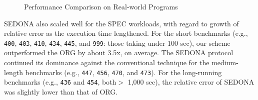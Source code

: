 \documentclass[letter]{ieice}
\begin{document}
\begin{figure}[t]
{		\label{fig:matc_std}
	}
	\vspace{-.1in}
	\caption{{\color{blue}Performance Comparison on Real-world Programs~\label{fig:synprog_test}}}
\vspace{-.2in}
\end{figure}

SEDONA also scaled well for the SPEC workloads, 
with regard to growth of relative error as the execution time lengthened.
For the short benchmarks 
(e.g., {\tt 400}, {\tt 403}, {\tt 410}, 
{\tt 434}, {\tt 445}, and {\tt 999}: those taking \hbox{under} 100 sec), 
our scheme outperformed the ORG by about 3.5x, on average. 
The SEDONA protocol continued its dominance against the conventional technique 
for the medium-length benchmarks (e.g., {\tt 447}, {\tt 456}, {\tt 470}, and {\tt 473}).
For the long-running benchmarks (e.g., {\tt 436} and {\tt 454}, both$>$ 1,000 sec), 
the relative error of \hbox{SEDONA} was slightly lower than that of ORG.

 
\end{document}
